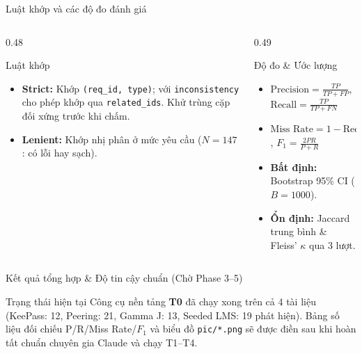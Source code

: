 \documentclass[aspectratio=169,10pt]{beamer}
\begin{document}
\begin{frame}{Luật khớp và các độ đo đánh giá}
  \begin{columns}[T]
    \begin{column}{0.48\textwidth}
      \begin{block}{Luật khớp}
        \begin{itemize}
          \item \textbf{Strict:} Khớp \texttt{(req\_id, type)}; với \texttt{inconsistency} cho phép khớp qua \texttt{related\_ids}. Khử trùng cặp đối xứng trước khi chấm.
          \item \textbf{Lenient:} Khớp nhị phân ở mức yêu cầu ($N = 147$: có lỗi hay sạch).
        \end{itemize}
      \end{block}
    \end{column}
    \begin{column}{0.49\textwidth}
      \begin{block}{Độ đo \& Ước lượng}
        \begin{itemize}
          \item $\text{Precision} = \frac{TP}{TP+FP}$, \quad $\text{Recall} = \frac{TP}{TP+FN}$
          \item $\text{Miss Rate} = 1 - \text{Recall}$, \quad $F_1 = \frac{2PR}{P+R}$
          \item \textbf{Bất định:} Bootstrap 95\% CI ($B = 1000$).
          \item \textbf{Ổn định:} Jaccard trung bình \& Fleiss' $\kappa$ qua 3 lượt.
        \end{itemize}
      \end{block}
    \end{column}
  \end{columns}
\end{frame}

\begin{frame}{Kết quả tổng hợp \& Độ tin cậy chuẩn (Chờ Phase 3--5)}
  \begin{block}{Trạng thái hiện tại}
    Công cụ nền tảng \textbf{T0} đã chạy xong trên cả 4 tài liệu (KeePass: 12, Peering: 21, Gamma J: 13, Seeded LMS: 19 phát hiện). Bảng số liệu đối chiếu P/R/Miss Rate/$F_1$ và biểu đồ \texttt{pic/*.png} sẽ được điền sau khi hoàn tất chuẩn chuyên gia Claude và chạy T1--T4.
  \end{block}
\end{frame}
\end{document}
